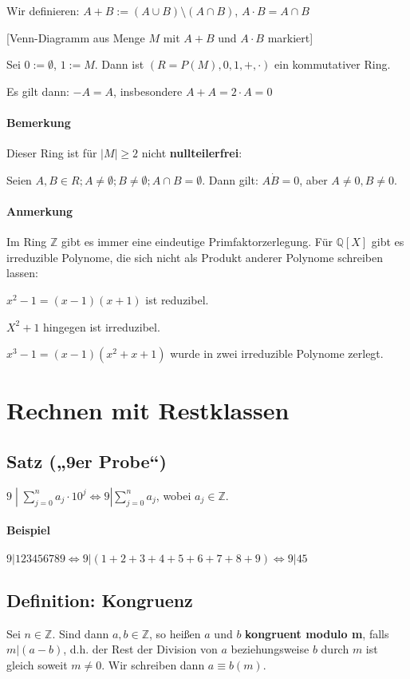 \documentclass[14pt,a4paper]{article}
\newcommand{\Z}{\ensuremath{\mathbb{Z}}}
\newcommand{\Q}{\ensuremath{\mathbb{Q}}}
\begin{document}
  Wir definieren: $A + B := ( A \cup B) \setminus (A \cap B)$, $A \cdot B = A
  \cap B$

  [Venn-Diagramm aus Menge $M$ mit $A+B$ und $A \cdot B$ markiert]

  Sei $ 0 := \emptyset $, $ 1 := M $.
  Dann ist $ ( R= P(M), 0, 1, +, \cdot ) $ ein kommutativer Ring.

  Es gilt dann: $ -A = A $, insbesondere $ A + A = 2 \cdot A = 0 $

  \paragraph{Bemerkung}
  Dieser Ring ist für $ |M| \geq 2 $ nicht \textbf{nullteilerfrei}:

  Seien $ A,B \in R ; A \neq \emptyset ; B \neq \emptyset ; A \cap B = \emptyset
  $.
  Dann gilt: $ A \dot B = 0$, aber $A \neq 0, B \neq 0$.

  \paragraph{Anmerkung}
  Im Ring $\Z$ gibt es immer eine eindeutige Primfaktorzerlegung.
  Für $ \Q[X] $ gibt es irreduzible Polynome, die sich nicht als Produkt anderer
  Polynome schreiben lassen:

  $ x^2 - 1 = (x-1)(x+1) $ ist reduzibel.

  $ X^2 + 1 $ hingegen ist irreduzibel.

  $ x^3 - 1 = (x-1)(x^2+x+1) $ wurde in zwei irreduzible Polynome zerlegt.

  \section{Rechnen mit Restklassen}
  \subsection{Satz („9er Probe“)}
  $ 9 \;| \; \sum_{j=0}^n a_j \cdot 10^j \Leftrightarrow 9 | \sum_{j=0}^n a_j $,
  wobei $a_j \in \Z$.

  \paragraph{Beispiel}
  $ 9 | 123456789 \Leftrightarrow 9 | (1+2+3+4+5+6+7+8+9) \Leftrightarrow 9 | 45
  $

  \subsection{Definition: Kongruenz}
  Sei $ n \in \Z $. Sind dann $a,b \in \Z$, so heißen $a$ und $b$
  \textbf{kongruent modulo m}, falls $m | (a-b)$, d.h. der Rest der Division von
  $a$ beziehungsweise $b$ durch $m$ ist gleich soweit $m \neq 0$.
  Wir schreiben dann $ a \equiv b (m)$.
\end{document}
